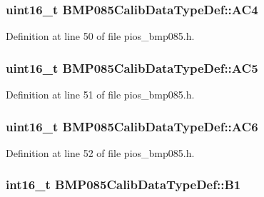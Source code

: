\hypertarget{struct_b_m_p085_calib_data_type_def_a4e595e57196b38e68364e6251350ac95}{
\subsubsection[{\-A\-C4}]{\setlength{\rightskip}{0pt plus 5cm}uint16\-\_\-t {\bf \-B\-M\-P085\-Calib\-Data\-Type\-Def\-::\-A\-C4}}}\label{struct_b_m_p085_calib_data_type_def_a4e595e57196b38e68364e6251350ac95}


\-Definition at line 50 of file pios\-\_\-bmp085.\-h.

\hypertarget{struct_b_m_p085_calib_data_type_def_aa844386cfe53dd2efeb4e3f4445282a1}{
\subsubsection[{\-A\-C5}]{\setlength{\rightskip}{0pt plus 5cm}uint16\-\_\-t {\bf \-B\-M\-P085\-Calib\-Data\-Type\-Def\-::\-A\-C5}}}\label{struct_b_m_p085_calib_data_type_def_aa844386cfe53dd2efeb4e3f4445282a1}


\-Definition at line 51 of file pios\-\_\-bmp085.\-h.

\hypertarget{struct_b_m_p085_calib_data_type_def_af89ddaa314bab8170726cd9ab0e6fc91}{
\subsubsection[{\-A\-C6}]{\setlength{\rightskip}{0pt plus 5cm}uint16\-\_\-t {\bf \-B\-M\-P085\-Calib\-Data\-Type\-Def\-::\-A\-C6}}}\label{struct_b_m_p085_calib_data_type_def_af89ddaa314bab8170726cd9ab0e6fc91}


\-Definition at line 52 of file pios\-\_\-bmp085.\-h.

\hypertarget{struct_b_m_p085_calib_data_type_def_a6f5c6e5cc70b5569922dc9c72fd80b6c}{
\subsubsection[{\-B1}]{\setlength{\rightskip}{0pt plus 5cm}int16\-\_\-t {\bf \-B\-M\-P085\-Calib\-Data\-Type\-Def\-::\-B1}}}\label{struct_b_m_p085_calib_data_type_def_a6f5c6e5cc70b5569922dc9c72fd80b6c}


